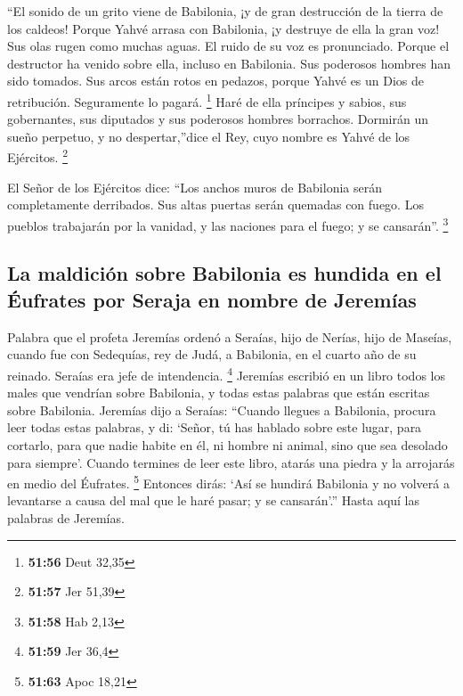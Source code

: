 \begin{paracol}{2}
 ``El sonido de un grito viene de Babilonia, ¡y de gran
destrucción de la tierra de los caldeos!  Porque Yahvé
arrasa con Babilonia, ¡y destruye de ella la gran voz! Sus olas rugen
como muchas aguas. El ruido de su voz es pronunciado. 
Porque el destructor ha venido sobre ella, incluso en Babilonia. Sus
poderosos hombres han sido tomados. Sus arcos están rotos en pedazos,
porque Yahvé es un Dios de retribución. Seguramente lo pagará.
\footnote{\textbf{51:56} Deut 32,35}  Haré de ella
príncipes y sabios, sus gobernantes, sus diputados y sus poderosos
hombres borrachos. Dormirán un sueño perpetuo, y no despertar,''dice el
Rey, cuyo nombre es Yahvé de los Ejércitos. \footnote{\textbf{51:57} Jer
  51,39}

 El Señor de los Ejércitos dice: ``Los anchos muros de
Babilonia serán completamente derribados. Sus altas puertas serán
quemadas con fuego. Los pueblos trabajarán por la vanidad, y las
naciones para el fuego; y se cansarán''. \footnote{\textbf{51:58} Hab
  2,13}

\hypertarget{la-maldiciuxf3n-sobre-babilonia-es-hundida-en-el-uxe9ufrates-por-seraja-en-nombre-de-jeremuxedas}{%
\subsection{La maldición sobre Babilonia es hundida en el Éufrates por
Seraja en nombre de
Jeremías}\label{la-maldiciuxf3n-sobre-babilonia-es-hundida-en-el-uxe9ufrates-por-seraja-en-nombre-de-jeremuxedas}}

 Palabra que el profeta Jeremías ordenó a Seraías, hijo
de Nerías, hijo de Maseías, cuando fue con Sedequías, rey de Judá, a
Babilonia, en el cuarto año de su reinado. Seraías era jefe de
intendencia. \footnote{\textbf{51:59} Jer 36,4}  Jeremías
escribió en un libro todos los males que vendrían sobre Babilonia, y
todas estas palabras que están escritas sobre Babilonia. 
Jeremías dijo a Seraías: ``Cuando llegues a Babilonia, procura leer
todas estas palabras,  y di: `Señor, tú has hablado sobre
este lugar, para cortarlo, para que nadie habite en él, ni hombre ni
animal, sino que sea desolado para siempre'.  Cuando
termines de leer este libro, atarás una piedra y la arrojarás en medio
del Éufrates. \footnote{\textbf{51:63} Apoc 18,21} 
Entonces dirás: `Así se hundirá Babilonia y no volverá a levantarse a
causa del mal que le haré pasar; y se cansarán'.'' Hasta aquí las
palabras de Jeremías.


\end{paracol}
